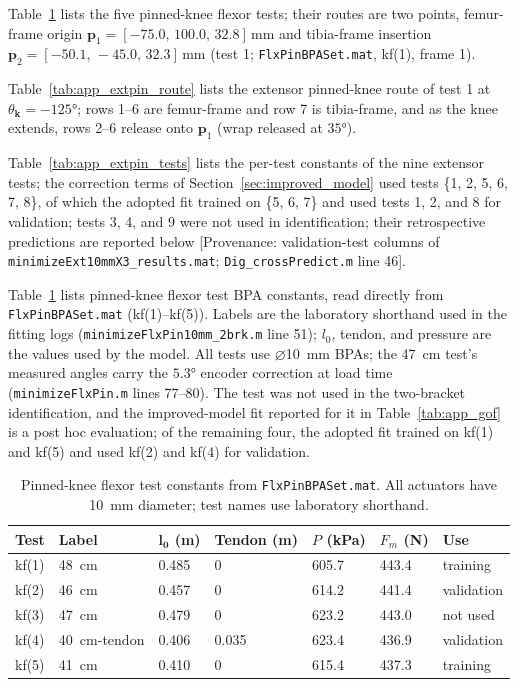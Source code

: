 Table~\ref{tab:app_flxpin_tests} lists the five pinned-knee flexor tests; their routes are two points, femur-frame origin $\mathbf{p}_{1} = [-75.0,\,100.0,\,32.8]\,\unit{\mm}$ and tibia-frame insertion $\mathbf{p}_{2} = [-50.1,\,-45.0,\,32.3]\,\unit{\mm}$ (test 1; \nolinkurl{FlxPinBPASet.mat}, kf(1), frame 1). 

Table~\ref{tab:app_extpin_route} lists the extensor pinned-knee route of test 1 at $\theta_{\mathbf{k}}=\ang{-125}$; rows 1--6 are femur-frame and row 7 is tibia-frame, and as the knee extends, rows 2--6 release onto $\mathbf{p}_{1}$ (wrap released at $\ang{+35}$). 

Table~\ref{tab:app_extpin_tests} lists the per-test constants of the nine extensor tests; the correction terms of Section~\ref{sec:improved_model} used tests \{1, 2, 5, 6, 7, 8\}, of which the adopted fit trained on \{5, 6, 7\} and used tests 1, 2, and 8 for validation; tests 3, 4, and 9 were not used in identification; their retrospective predictions are reported below [Provenance: validation-test columns of \nolinkurl{minimizeExt10mmX3_results.mat}; \nolinkurl{Dig_crossPredict.m} line 46].

Table~\ref{tab:app_flxpin_tests} lists pinned-knee flexor test BPA constants, read directly from \nolinkurl{FlxPinBPASet.mat} (kf(1)--kf(5)). Labels are the laboratory shorthand used in the fitting logs (\nolinkurl{minimizeFlxPin10mm_2brk.m} line 51); $l_{0}$, tendon, and pressure are the values used by the model. All tests use $\diameter$\qty{10}{\mm} BPAs; the \qty{47}{\cm} test's measured angles carry the $\ang{+5.3}$ encoder correction at load time (\nolinkurl{minimizeFlxPin.m} lines 77--80). The test was not used in the two-bracket identification, and the improved-model fit reported for it in Table~\ref{tab:app_gof} is a post hoc evaluation; of the remaining four, the adopted fit trained on kf(1) and kf(5) and used kf(2) and kf(4) for validation.

\begin{table}[htbp]
\caption{Pinned-knee flexor test constants from \nolinkurl{FlxPinBPASet.mat}. All actuators have \qty{10}{\mm} diameter; test names use laboratory shorthand.}
\label{tab:app_flxpin_tests}
\begin{tabular}{@{}lllllll@{}}
\toprule
\textbf{Test} & \textbf{Label} & $\boldsymbol{l_{0}}$ (\unit{\meter}) & Tendon (\unit{\meter}) & $P$ (\unit{\kPa}) & $F_{m}$ (\unit{\newton}) & \textbf{Use} \\
\midrule
kf(1) & \qty{48}{\cm}         & 0.485 & 0     & 605.7 & 443.4 & training \\
kf(2) & \qty{46}{\cm}         & 0.457 & 0     & 614.2 & 441.4 & validation \\
kf(3) & \qty{47}{\cm}         & 0.479 & 0     & 623.2 & 443.0 & not used \\
kf(4) & \qty{40}{\cm}-tendon  & 0.406 & 0.035 & 623.4 & 436.9 & validation \\
kf(5) & \qty{41}{\cm}         & 0.410 & 0     & 615.4 & 437.3 & training \\
\bottomrule
\end{tabular}
\end{table}

